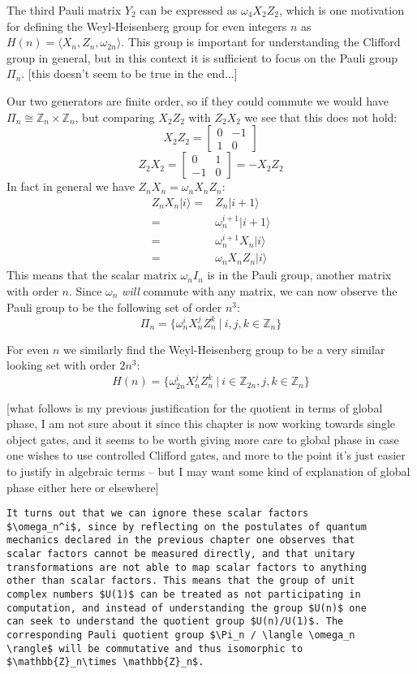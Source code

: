 \documentclass[]{article}
\newcommand{\ket}[1]{| #1 \rangle}
\begin{document}
The third Pauli matrix $Y_2$ can be expressed as $\omega_4X_2Z_2$, which is one motivation for defining the Weyl-Heisenberg group for even integers $n$ as $H(n) = \langle X_n, Z_n, \omega_{2n}\rangle$. This group is important for understanding the Clifford group in general, but in this context it is sufficient to focus on the Pauli group $\Pi_n$. [this doesn't seem to be true in the end...]

Our two generators are finite order, so if they could commute we would have $\Pi_n \cong \mathbb{Z}_n\times \mathbb{Z}_n$, but comparing $X_2Z_2$ with $Z_2X_2$ we see that this does not hold:
\[X_2Z_2 = \left[\begin{matrix}0&-1\\1&0\end{matrix}\right]\]
\[Z_2X_2 = \left[\begin{matrix}0&1\\-1&0\end{matrix}\right] = -X_2Z_2\]
In fact in general we have $Z_nX_n = \omega_nX_nZ_n$:
\begin{align*}
Z_nX_n\ket{i}
=& Z_n\ket{i+1}
\\=& \omega_n^{i+1}\ket{i+1}
\\=& \omega_n^{i+1}X_n\ket{i}
\\=& \omega_nX_nZ_n\ket{i}
\end{align*}
This means that the scalar matrix $\omega_nI_n$ is in the Pauli group, another matrix with order $n$. Since $\omega_n$ \textit{will} commute with any matrix, we can now observe the Pauli group to be the following set of order $n^3$:
\[\Pi_n = \{\omega_n^iX_n^jZ_n^k\ |\ i, j, k \in \mathbb{Z}_n\}\]

For even $n$ we similarly find the Weyl-Heisenberg group to be a very similar looking set with order $2n^3$:
\[H(n) = \{\omega_{2n}^iX_n^jZ_n^k\ |\ i \in \mathbb{Z}_{2n}, j, k \in \mathbb{Z}_n\}\]

[what follows is my previous justification for the quotient in terms of global phase, I am not sure about it since this chapter is now working towards single object gates, and it seems to be worth giving more care to global phase in case one wishes to use controlled Clifford gates, and more to the point it's just easier to justify in algebraic terms -- but I may want some kind of explanation of global phase either here or elsewhere]
\begin{verbatim}
It turns out that we can ignore these scalar factors 
$\omega_n^i$, since by reflecting on the postulates of quantum 
mechanics declared in the previous chapter one observes that 
scalar factors cannot be measured directly, and that unitary 
transformations are not able to map scalar factors to anything 
other than scalar factors. This means that the group of unit 
complex numbers $U(1)$ can be treated as not participating in 
computation, and instead of understanding the group $U(n)$ one 
can seek to understand the quotient group $U(n)/U(1)$. The 
corresponding Pauli quotient group $\Pi_n / \langle \omega_n 
\rangle$ will be commutative and thus isomorphic to 
$\mathbb{Z}_n\times \mathbb{Z}_n$.
\end{verbatim}
\end{document}
